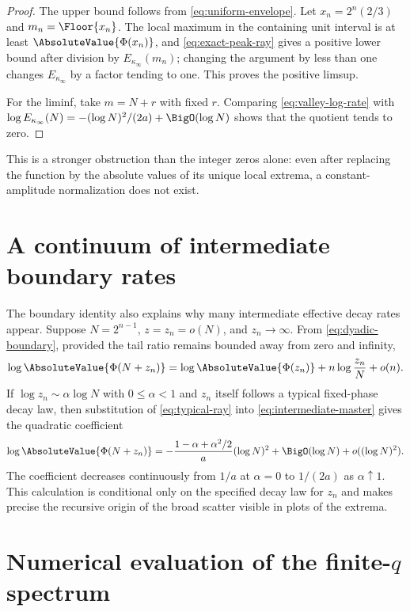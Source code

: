 \documentclass[11pt,oneside]{article}
\theoremstyle{definition}
\theoremstyle{remark}
\newcommand{\Phiup}{\Phi}
\begin{document}
\begin{proof}
The upper bound follows from \eqref{eq:uniform-envelope}.  Let
$x_n=2^n(2/3)$ and $m_n=\Floor{x_n}$.  The local maximum in the containing unit interval is
at least $\AbsoluteValue{\Phiup(x_n)}$, and \eqref{eq:exact-peak-ray} gives a positive lower bound
after division by $E_{\kappa_\infty}(m_n)$; changing the argument by less than one changes
$E_{\kappa_\infty}$ by a factor tending to one.  This proves the positive limsup.

For the liminf, take $m=N+r$ with fixed $r$.  Comparing
\eqref{eq:valley-log-rate} with
$\log E_{\kappa_\infty}(N)=-(\log N)^2/(2a)+\BigO(\log N)$ shows that the quotient tends to
zero.
\end{proof}

This is a stronger obstruction than the integer zeros alone: even after replacing the
function by the absolute values of its unique local extrema, a constant-amplitude
normalization does not exist.

\section{A continuum of intermediate boundary rates}
\label{sec:intermediate-rates}

The boundary identity also explains why many intermediate effective decay rates appear.
Suppose $N=2^{n-1}$, $z=z_n=o(N)$, and $z_n\to\infty$.  From
\eqref{eq:dyadic-boundary}, provided the tail ratio remains bounded away from zero and
infinity,
\begin{equation}
 \log\AbsoluteValue{\Phiup(N+z_n)}
 =\log\AbsoluteValue{\Phiup(z_n)}+n\log\frac{z_n}{N}+o(n).
 \label{eq:intermediate-master}
\end{equation}
If $\log z_n\sim\alpha\log N$ with $0\le\alpha<1$ and $z_n$ itself follows a typical
fixed-phase decay law, then substitution of \eqref{eq:typical-ray} into
\eqref{eq:intermediate-master} gives the quadratic coefficient
\begin{equation}
 \log\AbsoluteValue{\Phiup(N+z_n)}
 =-\frac{1-\alpha+\alpha^2/2}{a}(\log N)^2
  +\BigO(\log N)+o((\log N)^2).
 \label{eq:intermediate-quadratic}
\end{equation}
The coefficient decreases continuously from $1/a$ at $\alpha=0$ to $1/(2a)$ as
$\alpha\uparrow1$.  This calculation is conditional only on the specified decay law for
$z_n$ and makes precise the recursive origin of the broad scatter visible in plots of the
extrema.

\section{Numerical evaluation of the finite-\texorpdfstring{$q$}{q} spectrum}
\label{sec:numerics}
\end{document}
